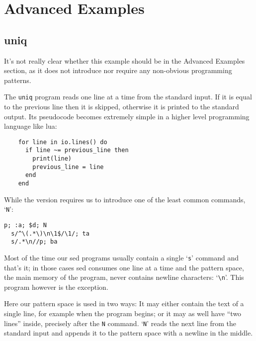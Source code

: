 \section{Advanced Examples}

\subsection{uniq}

It's not really clear whether this example should be in the Advanced Examples
section, as it does not introduce nor require any non-obvious programming
patterns.

The {\tt uniq} program reads one line at a time from the standard input.
If it is equal to the previous line then it is skipped, otherwise it is printed
to the standard output.  Its pseudocode becomes extremely simple in a higher
level programming language like lua:

	\begin{Verbatim}
	for line in io.lines() do
	  if line ~= previous_line then
	    print(line)
	    previous_line = line
	  end
	end
	\end{Verbatim}

While the \sed version requires us to introduce one of the least common
commands, `{\tt N}':

\begin{Verbatim}
p; :a; $d; N
  s/^\(.*\)\n\1$/\1/; ta
  s/.*\n//p; ba
\end{Verbatim}

Most of the time our sed programs usually contain a single `{\tt s}' command
and that's it; in those cases sed consumes one line at a time and the pattern
space, the main memory of the program, never contains newline characters:
`\verb|\n|'.  This program however is the exception.

Here our pattern space is used in two ways: It may either contain the text of a
single line, for example when the program begins; or it may as well have ``two
lines'' inside, precisely after the {\tt N} command.
`{\tt N}' reads the next line from the standard input and appends it to the
pattern space with a newline in the middle.

